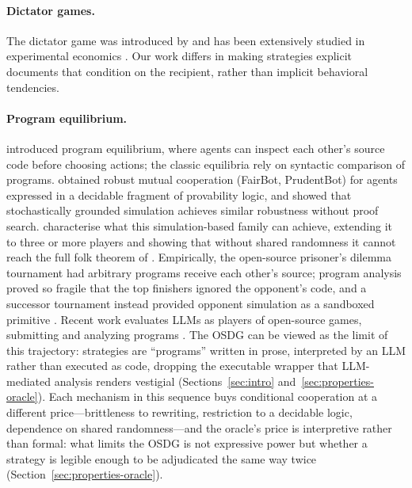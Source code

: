 \documentclass[11pt]{article}
\begin{document}
\paragraph{Dictator games.}
The dictator game was introduced by \citet{kahneman1986fairness}
and has been extensively studied in experimental economics
\citep{engel2011dictator}.
Our work differs in making strategies explicit documents that
condition on the recipient, rather than implicit behavioral
tendencies.

\paragraph{Program equilibrium.}
\citet{tennenholtz2004program} introduced program equilibrium,
where agents can inspect each other's source code before choosing
actions; the classic equilibria rely on syntactic comparison of
programs.
\citet{barasz2014robust} obtained robust mutual cooperation
(FairBot, PrudentBot) for agents expressed in a decidable fragment
of provability logic, and \citet{oesterheld2019robust} showed that
stochastically grounded simulation achieves similar robustness
without proof search.
\citet{cooper2025characterising} characterise what this
simulation-based family can achieve, extending it to three or more
players and showing that without shared randomness it cannot reach
the full folk theorem of \citet{tennenholtz2004program}.
Empirically, the open-source prisoner's dilemma tournament
\citep{ospd2013lesswrong} had arbitrary programs receive each other's
source; program analysis proved so fragile that the top finishers
ignored the opponent's code, and a successor tournament instead
provided opponent simulation as a sandboxed primitive
\citep{pdtournament2014}.
Recent work evaluates LLMs as players of open-source games,
submitting and analyzing programs \citep{sistla2025evaluating}.
The OSDG can be viewed as the limit of this trajectory: strategies
are ``programs'' written in prose, interpreted by an LLM rather than
executed as code, dropping the executable wrapper that
LLM-mediated analysis renders vestigial
(Sections~\ref{sec:intro} and~\ref{sec:properties-oracle}).
Each mechanism in this sequence buys conditional cooperation at a
different price---brittleness to rewriting, restriction to a
decidable logic, dependence on shared randomness---and the oracle's
price is interpretive rather than formal: what limits the OSDG is not
expressive power but whether a strategy is legible enough to be
adjudicated the same way twice
(Section~\ref{sec:properties-oracle}).
\end{document}

